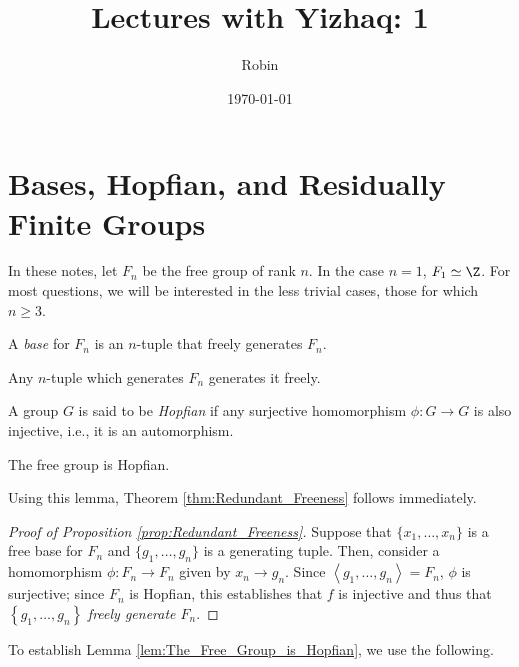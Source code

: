 \documentclass[12pt]{article}
\title{Lectures with Yizhaq: 1}
\author{Robin}
\date{\today}
\begin{document}
\maketitle

\section{Bases, Hopfian, and Residually Finite Groups}

In these notes, let $F_n$ be the free group of rank $n$. In the case $n = 1$, $F_1 \simeq \Z$. For most questions, we will be interested in the less trivial cases, those for which $n \geq 3$. 

\begin{definition}\label{def:Base_for_Free_Group}
    A \emph{base} for $F_n$ is an $n$-tuple that freely generates $F_n$.
\end{definition}

\begin{theorem}\label{thm:Redundant_Freeness}
    Any $n$-tuple which generates $F_n$ generates it freely.
\end{theorem}

\begin{definition}[Hopfian]\label{def:Hopfian}
    A group $G$ is said to be \emph{Hopfian} if any surjective homomorphism $\phi: G \rightarrow G$ is also injective, i.e., it is an automorphism. 
\end{definition}

\begin{lemma}\label{lem:The_Free_Group_is_Hopfian}
    The free group is Hopfian.
\end{lemma}

Using this lemma, Theorem \ref{thm:Redundant_Freeness} follows immediately. 

\begin{proof}[Proof of Proposition \ref{prop:Redundant_Freeness}]
    Suppose that $\{x_1, \ldots, x_n\}$ is a free base for $F_n$ and $\{g_1, \ldots, g_n\}$ is a generating tuple. Then, consider a homomorphism $\phi: F_n \rightarrow F_n$ given by $x_n \rightarrow g_n$. Since $\left<g_1, \ldots, g_n\right> = F_n$, $\phi$ is surjective; since $F_n$ is Hopfian, this establishes that $f$ is injective and thus that $\left\{g_1, \ldots, g_n\right\}$ \emph{freely generate $F_n$}.
\end{proof}

To establish Lemma \ref{lem:The_Free_Group_is_Hopfian}, we use the following.
\end{document}
